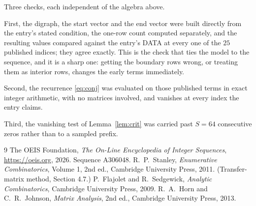 \documentclass[11pt,a4paper]{article}
\theoremstyle{plain}
\theoremstyle{definition}
\begin{document}
Three checks, each independent of the algebra above.

First, the digraph, the start vector and the end vector were built directly from the
entry's stated condition, the one-row count computed separately, and the resulting values
compared against the entry's DATA at every one of the $25$ published indices; they
agree exactly. This is the check that ties the model to the sequence, and it is a sharp one:
getting the boundary rows wrong, or treating them as interior rows, changes the early terms
immediately.

Second, the recurrence \eqref{eq:conj} was evaluated on those published terms in exact
integer arithmetic, with no matrices involved, and vanishes at every index the entry claims.

Third, the vanishing test of Lemma~\ref{lem:crit} was carried past $S=64$ consecutive
zeros rather than to a sampled prefix.

\begin{thebibliography}{9}
 The OEIS Foundation, \emph{The On-Line Encyclopedia of Integer
Sequences}, \url{https://oeis.org}, 2026. Sequence A306048.
 R.~P.~Stanley, \emph{Enumerative Combinatorics}, Volume 1, 2nd ed.,
Cambridge University Press, 2011. (Transfer-matrix method, Section 4.7.)
 P.~Flajolet and R.~Sedgewick, \emph{Analytic Combinatorics}, Cambridge
University Press, 2009.
 R.~A.~Horn and C.~R.~Johnson, \emph{Matrix Analysis}, 2nd ed., Cambridge
University Press, 2013.
\end{thebibliography}
\end{document}
